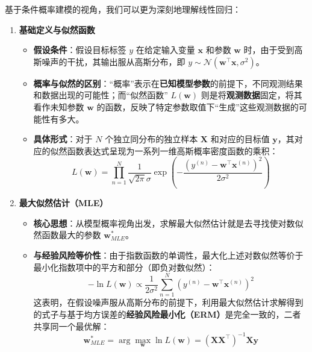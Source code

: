 \documentclass{article}
\theoremstyle{remark}
\theoremstyle{definition}
\theoremstyle{plain}
\numberwithin {equation}{section}
\numberwithin{assumption}{section}
\begin{document}
基于条件概率建模的视角，我们可以更为深刻地理解线性回归：
\begin{enumerate}
    \item \textbf{基础定义与似然函数}
    \begin{itemize}
        \item \textbf{假设条件}：假设目标标签 $y$ 在给定输入变量 $\boldsymbol{x}$ 和参数 $\boldsymbol{w}$ 时，由于受到高斯噪声的干扰，其输出服从高斯分布，即 $y \sim \mathcal{N}(\boldsymbol{w}^\top \boldsymbol{x}, \sigma^2)$。
        \item \textbf{概率与似然的区别}：“概率”表示在\textbf{已知模型参数}的前提下，不同观测结果和数据出现的可能性；而“似然函数” $L(\boldsymbol{w})$ 则是将\textbf{观测数据}固定，将其看作未知参数 $\boldsymbol{w}$ 的函数，反映了特定参数取值下“生成”这些观测数据的可能性有多大。
        \item \textbf{具体形式}：对于 $N$ 个独立同分布的独立样本 $\boldsymbol{X}$ 和对应的目标值 $\boldsymbol{y}$，其对应的似然函数表达式呈现为一系列一维高斯概率密度函数的乘积：
        \begin{equation*}
        L(\boldsymbol{w}) = \prod_{n=1}^N \frac{1}{\sqrt{2\pi}\sigma} \exp\left(-\frac{(y^{(n)} - \boldsymbol{w}^\top \boldsymbol{x}^{(n)})^2}{2\sigma^2}\right)
        \end{equation*}
    \end{itemize}

    \item \textbf{最大似然估计（MLE）}
    \begin{itemize}
        \item \textbf{核心思想}：从模型概率视角出发，求解最大似然估计就是去寻找使对数似然函数最大的参数 $\boldsymbol{w}^*_{MLE}$。
        \item \textbf{与经验风险等价性}：由于指数函数的单调性，最大化上述对数似然等价于最小化指数项中的平方和部分（即负对数似然）：
        \begin{equation*}
        -\ln L(\boldsymbol{w}) \propto \frac{1}{2\sigma^2} \sum_{n=1}^N \left(y^{(n)} - \boldsymbol{w}^\top \boldsymbol{x}^{(n)}\right)^2 
        \end{equation*}
        这表明，在假设噪声服从高斯分布的前提下，利用最大似然估计求解得到的式子与基于均方误差的\textbf{经验风险最小化（ERM）}是完全一致的，二者共享同一个最优解：
        \begin{equation*}
        \boldsymbol{w}^*_{MLE} = \arg\max_{\boldsymbol{w}} \ln L(\boldsymbol{w}) = (\boldsymbol{X}\boldsymbol{X}^\top)^{-1}\boldsymbol{X}\boldsymbol{y}
        \end{equation*}
    \end{itemize}


\end{enumerate}
\end{document}
